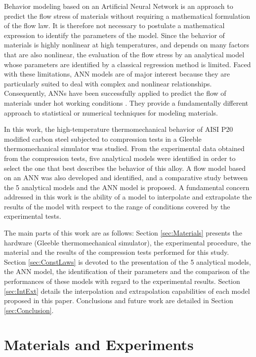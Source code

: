 \documentclass[twoside,english,1p,final,sort&compress]{elsarticle}
\theoremstyle{plain}
\begin{document}
Behavior modeling based on an Artificial Neural Network is an approach to predict the flow stress of materials without requiring a mathematical formulation of the flow law.
It is therefore not necessary to postulate a mathematical expression to identify the parameters of the model.
Since the behavior of materials is highly nonlinear at high temperatures, and depends on many factors that are also nonlinear, the evaluation of the flow stress by an analytical model whose parameters are identified by a classical regression method is limited.
Faced with these limitations, ANN models are of major interest because they are particularly suited to deal with complex and nonlinear relationships.
Consequently, ANNs have been successfully applied to predict the flow of materials under hot working conditions \cite{Lin-2008-ANN, Lu-2011-ANN, Ashtiani-2016-CSP, Stoffel-2019-NNB, Pantale-2021}.
They provide a fundamentally different approach to statistical or numerical techniques for modeling materials.

In this work, the high-temperature thermomechanical behavior of AISI P20 modified carbon steel subjected to compression tests in a Gleeble thermomechanical simulator was studied.
From the experimental data obtained from the compression tests, five analytical models were identified in order to select the one that best describes the behavior of this alloy.
A flow model based on an ANN was also developed and identified, and a comparative study between the 5 analytical models and the ANN model is proposed.
A fundamental concern addressed in this work is the ability of a model to interpolate and extrapolate the results of the model with respect to the range of conditions covered by the experimental tests.

The main parts of this work are as follows: Section \ref{sec:Materials} presents the hardware (Gleeble thermomechanical simulator), the experimental procedure, the material and the results of the compression tests performed for this study.
Section \ref{sec:ConstLaws} is devoted to the presentation of the 5 analytical models, the ANN model, the identification of their parameters and the comparison of the performances of these models with regard to the experimental results.
Section \ref{sec:IntExt} details the interpolation and extrapolation capabilities of each model proposed in this paper.
Conclusions and future work are detailed in Section \ref{sec:Conclusion}.

\section{Materials and Experiments\label{sec:Materials}}
\end{document}
